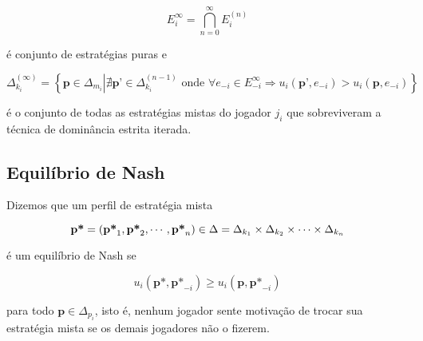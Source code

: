 \begin{equation}\nonumber
E_i^{\infty}=\bigcap_{n=0}^{\infty}{E_i^{(n)}}
\end{equation}\vspace{0.1cm}

é conjunto de estratégias puras e 

\begin{equation}\nonumber
\Delta_{k_i}^{(\infty)}=\left\{\textbf{p}\in \Delta_{m_i}\left|\nexists\textbf{p'}\in\Delta_{k_i}^{(n-1)}\text{ onde }\forall e_{-i}\in E_{-i}^{\infty}\Rightarrow u_i(\textbf{p'},e_{-i})>u_i(\textbf{p},e_{-i})\right.\right\}
\end{equation}\vspace{0.1cm}

é o conjunto de todas as estratégias mistas do jogador $j_i$ que sobreviveram a técnica de dominância estrita iterada.

\subsection{Equilíbrio de Nash}

Dizemos que um perfil de estratégia mista 

\begin{equation}\nonumber
\textbf{p*}=(\textbf{p*}_1,\textbf{p*}_2,\cdots,\textbf{p*}_{n})\in\Delta=\Delta_{k_1}\times\Delta_{k_2}\times\cdots\times\Delta_{k_n}
\end{equation}\vspace{0.1cm}

é um equilíbrio de Nash se

\begin{equation}\nonumber
u_i(\textbf{p*},\textbf{p*}_{-i})\geq u_i(\textbf{p},\textbf{p*}_{-i})
\end{equation}\vspace{0.1cm}

para todo $\textbf{p} \in \Delta_{p_i}$, isto é, nenhum jogador sente motivação de trocar sua estratégia mista se os demais jogadores não o fizerem.

